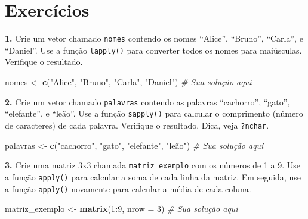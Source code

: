 \documentclass[
]{book}
\newenvironment{Shaded}{\begin{snugshade}}{\end{snugshade}}
\newcommand{\AttributeTok}[1]{\textcolor[rgb]{0.13,0.29,0.53}{#1}}
\newcommand{\CommentTok}[1]{\textcolor[rgb]{0.56,0.35,0.01}{\textit{#1}}}
\newcommand{\DecValTok}[1]{\textcolor[rgb]{0.00,0.00,0.81}{#1}}
\newcommand{\DocumentationTok}[1]{\textcolor[rgb]{0.56,0.35,0.01}{\textbf{\textit{#1}}}}
\newcommand{\FunctionTok}[1]{\textcolor[rgb]{0.13,0.29,0.53}{\textbf{#1}}}
\newcommand{\NormalTok}[1]{#1}
\newcommand{\OtherTok}[1]{\textcolor[rgb]{0.56,0.35,0.01}{#1}}
\newcommand{\SpecialCharTok}[1]{\textcolor[rgb]{0.81,0.36,0.00}{\textbf{#1}}}
\newcommand{\StringTok}[1]{\textcolor[rgb]{0.31,0.60,0.02}{#1}}
\begin{document}
\begin{Shaded}
\end{Shaded}

\section{Exercícios}\label{exercuxedcios-12}

\textbf{1.} Crie um vetor chamado \texttt{nomes} contendo os nomes ``Alice'', ``Bruno'',
``Carla'', e ``Daniel''. Use a função \texttt{lapply()} para converter todos os
nomes para maiúsculas. Verifique o resultado.

\begin{Shaded}
\begin{Highlighting}[]
\NormalTok{nomes }\OtherTok{\textless{}{-}} \FunctionTok{c}\NormalTok{(}\StringTok{"Alice"}\NormalTok{, }\StringTok{"Bruno"}\NormalTok{, }\StringTok{"Carla"}\NormalTok{, }\StringTok{"Daniel"}\NormalTok{)}
\CommentTok{\# Sua solução aqui}
\end{Highlighting}
\end{Shaded}

\textbf{2.} Crie um vetor chamado \texttt{palavras} contendo as palavras ``cachorro'',
``gato'', ``elefante'', e ``leão''. Use a função \texttt{sapply()} para calcular o
comprimento (número de caracteres) de cada palavra. Verifique o
resultado. Dica, veja \texttt{?nchar}.

\begin{Shaded}
\begin{Highlighting}[]
\NormalTok{palavras }\OtherTok{\textless{}{-}} \FunctionTok{c}\NormalTok{(}\StringTok{"cachorro"}\NormalTok{, }\StringTok{"gato"}\NormalTok{, }\StringTok{"elefante"}\NormalTok{, }\StringTok{"leão"}\NormalTok{)}
\CommentTok{\# Sua solução aqui}
\end{Highlighting}
\end{Shaded}

\textbf{3.} Crie uma matriz 3x3 chamada \texttt{matriz\_exemplo} com os números de 1
a 9. Use a função \texttt{apply()} para calcular a soma de cada linha da
matriz. Em seguida, use a função \texttt{apply()} novamente para calcular a
média de cada coluna.

\begin{Shaded}
\begin{Highlighting}[]
\NormalTok{matriz\_exemplo }\OtherTok{\textless{}{-}} \FunctionTok{matrix}\NormalTok{(}\DecValTok{1}\SpecialCharTok{:}\DecValTok{9}\NormalTok{, }\AttributeTok{nrow =} \DecValTok{3}\NormalTok{)}
\CommentTok{\# Sua solução aqui}
\end{Highlighting}
\end{Shaded}
\end{document}
